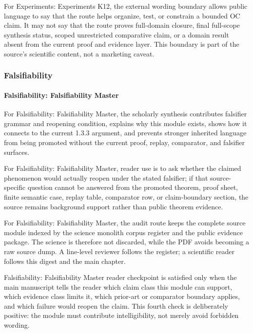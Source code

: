 For Experiments: Experiments K12, the external wording boundary allows public language to say that the route helps organize, test, or constrain a bounded OC claim. It may not say that the route proves full-domain closure, final full-scope synthesis status, scoped unrestricted comparative claim, or a domain result absent from the current proof and evidence layer. This boundary is part of the source's scientific content, not a marketing caveat.


\subsubsection{Falsifiability}

\paragraph{Falsifiability: Falsifiability Master}

For Falsifiability: Falsifiability Master, the scholarly synthesis contributes falsifier grammar and reopening condition, explains why this module exists, shows how it connects to the current 1.3.3 argument, and prevents stronger inherited language from being promoted without the current proof, replay, comparator, and falsifier surfaces.


For Falsifiability: Falsifiability Master, reader use is to ask whether the claimed phenomenon would actually reopen under the stated falsifier; if that source-specific question cannot be answered from the promoted theorem, proof sheet, finite semantic case, replay table, comparator row, or claim-boundary section, the source remains background support rather than public theorem evidence.


For Falsifiability: Falsifiability Master, the audit route keeps the complete source module indexed by the science monolith corpus register and the public evidence package. The science is therefore not discarded, while the PDF avoids becoming a raw source dump. A line-level reviewer follows the register; a scientific reader follows this digest and the main chapter.


Falsifiability: Falsifiability Master reader checkpoint is satisfied only when the main manuscript tells the reader which claim class this module can support, which evidence class limits it, which prior-art or comparator boundary applies, and which failure would reopen the claim. This fourth check is deliberately positive: the module must contribute intelligibility, not merely avoid forbidden wording.


